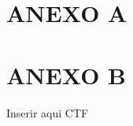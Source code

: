 \vspace{15}
\section*{\centering ANEXO A}
\vspace{15}
\clearpage
\newpage

\clearpage
\newpage

\clearpage
\newpage


\vspace{10}
\section*{\centering ANEXO B}
\vspace{10}
\clearpage
\newpage
Inserir aqui CTF

